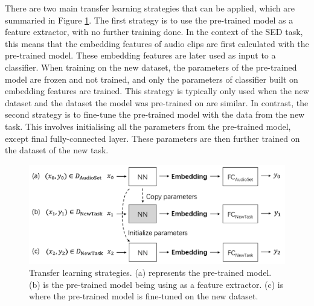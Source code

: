 There are two main transfer learning strategies that can be applied, which are summaried in Figure \ref{fig:transfer-learning}. The first strategy is to use the pre-trained model as a feature extractor, with no further training done. In the context of the SED task, this means that the embedding features of audio clips are first calculated with the pre-trained model. These embedding features are later used as input to a classifier. When training on the new dataset, the parameters of the pre-trained model are frozen and not trained, and only the parameters of classifier built on embedding features are trained. This strategy is typically only used when the new dataset and the dataset the model was pre-trained on are similar. In contrast, the second strategy is to fine-tune the pre-trained model with the data from the new task. This involves initialising all the parameters from the pre-trained model, except final fully-connected layer. These parameters are then further trained on the dataset of the new task.

\begin{figure}[!htp]
    \centering
    \includegraphics[width=\textwidth]{fig/transfer-learning.png}
    \caption{Transfer learning strategies. (a) represents the pre-trained model. (b) is the pre-trained model being using as a feature extractor. (c) is where the pre-trained model is fine-tuned on the new dataset.}
    \label{fig:transfer-learning}
\end{figure}

